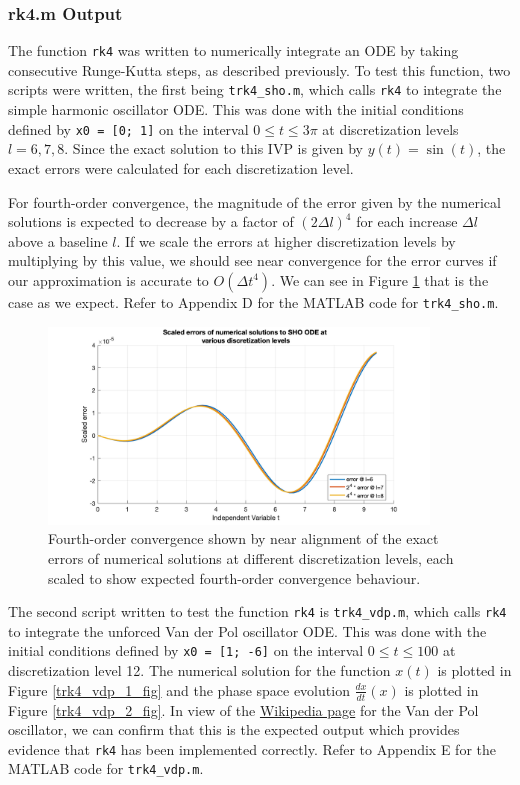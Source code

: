 \documentclass[10pt]{article}
\def\code#1{\texttt{#1}} %
\begin{document}
\subsubsection*{rk4.m Output}

The function \code{rk4} was written to numerically integrate an ODE by taking consecutive 
Runge-Kutta steps, as described previously. To test this function, two scripts were written, the 
first being \code{trk4\_sho.m}, which calls \code{rk4} to integrate the simple harmonic oscillator 
ODE. This was done with the initial conditions defined by \code{x0 = [0; 1]} on the interval 
$0 \leq t \leq 3\pi$ at discretization levels $l = 6, 7, 8$. Since the exact solution to this IVP
is given by $y(t) = \sin(t)$, the exact errors were calculated for each discretization level.

For fourth-order convergence, the magnitude of the error given by the numerical solutions is expected 
to decrease by a factor of $(2 \Delta l)^4$ for each increase $\Delta l$ above a baseline $l$. If we 
scale the errors at higher discretization levels by multiplying by this value, we should see near 
convergence for the error curves if our approximation is accurate to $O(\Delta t^4)$. We can see in 
Figure \ref{trk4_sho_2_fig} that is the case as we expect. Refer to Appendix D for the MATLAB code 
for \code{trk4\_sho.m}.

\begin{figure}[H]
\centering
\includegraphics[width=0.9\textwidth]{trk4_sho_2.png}
\caption{Fourth-order convergence shown by near alignment of the exact errors of numerical solutions 
at different discretization levels, each scaled to show expected fourth-order convergence behaviour.
}\label{trk4_sho_2_fig}
\end{figure}

The second script written to test the function \code{rk4} is \code{trk4\_vdp.m}, which calls \code{rk4} 
to integrate the unforced Van der Pol oscillator ODE. This was done with the initial conditions defined 
by \code{x0 = [1; -6]} on the interval $0 \leq t \leq 100$ at discretization level 12. The numerical 
solution for the function $x(t)$ is plotted in Figure \ref{trk4_vdp_1_fig} and the phase space 
evolution $\frac{dx}{dt}(x)$ is plotted in Figure \ref{trk4_vdp_2_fig}. In view of the 
\href{https://en.wikipedia.org/wiki/Van_der_Pol_oscillator}{Wikipedia page} for the Van der Pol 
oscillator, we can confirm that this is the expected output which provides evidence that \code{rk4} has 
been implemented correctly. Refer to Appendix E for the MATLAB code for \code{trk4\_vdp.m}.
\end{document}
